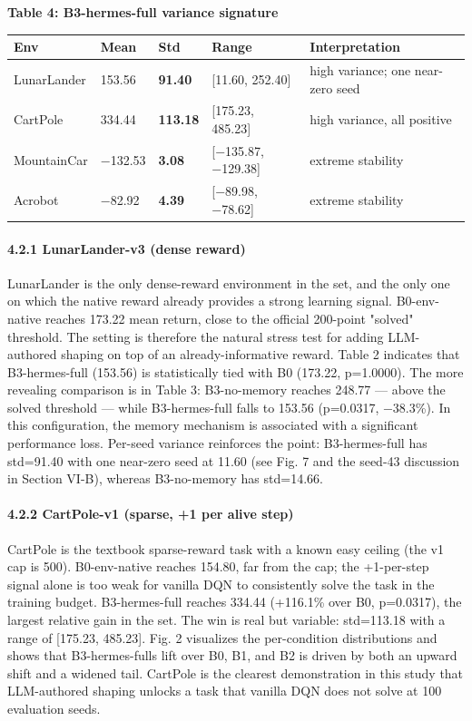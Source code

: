 \textbf{Table 4: B3-hermes-full variance signature}

{\def\LTcaptype{none} %
\begin{longtable}[]{@{}lllll@{}}
\toprule\noalign{}
Env & Mean & Std & Range & Interpretation \\
\midrule\noalign{}
\endhead
\bottomrule\noalign{}
\endlastfoot
LunarLander & 153.56 & \textbf{91.40} & {[}11.60, 252.40{]} & high variance; one near-zero seed \\
CartPole & 334.44 & \textbf{113.18} & {[}175.23, 485.23{]} & high variance, all positive \\
MountainCar & −132.53 & \textbf{3.08} & {[}−135.87, −129.38{]} & extreme stability \\
Acrobot & −82.92 & \textbf{4.39} & {[}−89.98, −78.62{]} & extreme stability \\
\end{longtable}
}

\paragraph{4.2.1 LunarLander-v3 (dense reward)}\label{421-lunarlander-v3-dense-reward}

LunarLander is the only dense-reward environment in the set, and the only one on which the native reward already provides a strong learning signal. B0-env-native reaches 173.22 mean return, close to the official 200-point "solved" threshold. The setting is therefore the natural stress test for adding LLM-authored shaping on top of an already-informative reward. Table 2 indicates that B3-hermes-full (153.56) is statistically tied with B0 (173.22, p=1.0000). The more revealing comparison is in Table 3: B3-no-memory reaches 248.77 --- above the solved threshold --- while B3-hermes-full falls to 153.56 (p=0.0317, −38.3\%). In this configuration, the memory mechanism is associated with a significant performance loss. Per-seed variance reinforces the point: B3-hermes-full has std=91.40 with one near-zero seed at 11.60 (see Fig. 7 and the seed-43 discussion in Section VI-B), whereas B3-no-memory has std=14.66.

\paragraph{4.2.2 CartPole-v1 (sparse, +1 per alive step)}\label{422-cartpole-v1-sparse-1-per-alive-step}

CartPole is the textbook sparse-reward task with a known easy ceiling (the v1 cap is 500). B0-env-native reaches 154.80, far from the cap; the +1-per-step signal alone is too weak for vanilla DQN to consistently solve the task in the training budget. B3-hermes-full reaches 334.44 (+116.1\% over B0, p=0.0317), the largest relative gain in the set. The win is real but variable: std=113.18 with a range of {[}175.23, 485.23{]}. Fig. 2 visualizes the per-condition distributions and shows that B3-hermes-full\textquotesingle s lift over B0, B1, and B2 is driven by both an upward shift and a widened tail. CartPole is the clearest demonstration in this study that LLM-authored shaping unlocks a task that vanilla DQN does not solve at 100 evaluation seeds.

